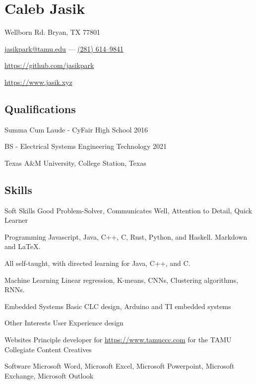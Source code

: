 \documentclass[letterpaper,10pt]{article}
\begin{document}
    \section{\Huge Caleb Jasik}\label{sec:hugecaleb-jasik}

    \hfill Wellborn Rd. Bryan, TX 77801

    \hfill \href{mailto:jasikpark@tamu.edu}{jasikpark@tamu.edu} ---
    \href{tel:2816149841}{(281) 614--9841}

    \hfill \href{https://github.com/jasikpark}{https://github.com/jasikpark}

    \hfill \href{https://jasik.xyz}{https://www.jasik.xyz}

    \subsection{Qualifications}\label{subsec:qualifications}

    Summa Cum Laude - CyFair High School 2016

    BS - Electrical Systems Engineering Technology 2021

    Texas A\&M University, College Station, Texas


    \subsection{Skills}\label{subsec:skills}

    \begin{skills}
        \item[Soft Skills]
        Good Problem-Solver, Communicates Well, Attention to Detail, Quick Learner
        \item[Programming]
        Javascript, Java, C++, C, Rust, Python, and Haskell. Markdown and LaTeX.

        All self-taught, with directed learning for Java, C++, and C\@.
        \item[Machine Learning]
        Linear regression, K-means, CNNs, Clustering algorithms, RNNs.
        \item[Embedded Systems]
        Basic CLC design, Arduino and TI embedded systems
        \item[Other Interests]
        User Experience design
        \item[Websites]
        Principle developer for \href{https://www.tamuccc.com}{https://www.tamuccc.com} for the TAMU Collegiate Content Creatives
        \item[Software]
        Microsoft Word, Microsoft Excel, Microsoft Powerpoint, Microsoft Exchange, Microsoft Outlook
    \end{skills}
\end{document}
